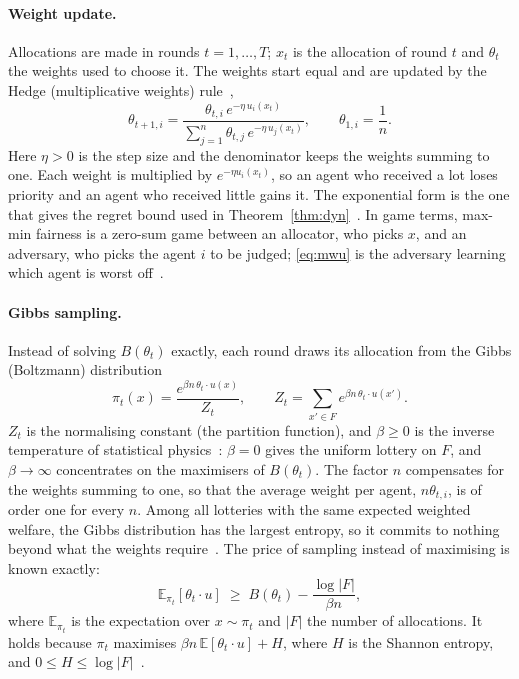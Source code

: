 \documentclass[11pt,a4paper]{article}
\newcommand{\E}{\mathbb{E}}
\begin{document}
\paragraph{Weight update.} Allocations are made in rounds $t=1,\dots,T$; $x_t$ is the allocation of round
$t$ and $\theta_t$ the weights used to choose it. The weights start equal and are updated by the Hedge
(multiplicative weights) rule~\cite{freund1997decision,freund1999adaptive,arora2012multiplicative},
\begin{equation}\label{eq:mwu}
\theta_{t+1,i}=\frac{\theta_{t,i}\,e^{-\eta\,u_i(x_t)}}{\sum_{j=1}^n\theta_{t,j}\,e^{-\eta\,u_j(x_t)}},
\qquad\theta_{1,i}=\frac1n .
\end{equation}
Here $\eta>0$ is the step size and the denominator keeps the weights summing to one. Each weight is
multiplied by $e^{-\eta u_i(x_t)}$, so an agent who received a lot loses priority and an agent who
received little gains it. The exponential form is the one that gives the regret bound used in
Theorem~\ref{thm:dyn}~\cite{freund1997decision,cesabianchi2006prediction}. In game terms, max-min
fairness is a zero-sum game between an allocator, who picks $x$, and an adversary, who picks the agent
$i$ to be judged; \eqref{eq:mwu} is the adversary learning which agent is worst
off~\cite{freund1999adaptive}.

\paragraph{Gibbs sampling.} Instead of solving $B(\theta_t)$ exactly, each round draws its allocation
from the Gibbs (Boltzmann) distribution
\begin{equation}\label{eq:gibbs}
\pi_t(x)=\frac{e^{\beta n\,\theta_t\cdot u(x)}}{Z_t},\qquad Z_t=\sum_{x'\in F}e^{\beta n\,\theta_t\cdot u(x')} .
\end{equation}
$Z_t$ is the normalising constant (the partition function), and $\beta\ge0$ is the inverse temperature
of statistical physics~\cite{metropolis1953equation,jaynes1957information}: $\beta=0$ gives the uniform
lottery on $F$, and $\beta\to\infty$ concentrates on the maximisers of $B(\theta_t)$. The factor $n$
compensates for the weights summing to one, so that the average weight per agent, $n\theta_{t,i}$, is
of order one for every $n$. Among all lotteries with the same expected weighted welfare, the Gibbs
distribution has the largest entropy, so it commits to nothing beyond what the weights
require~\cite{jaynes1957information}. The price of sampling instead of maximising is known exactly:
\begin{equation}\label{eq:entropy}
\E_{\pi_t}[\theta_t\cdot u]\;\ge\;B(\theta_t)-\frac{\log|F|}{\beta n},
\end{equation}
where $\E_{\pi_t}$ is the expectation over $x\sim\pi_t$ and $|F|$ the number of allocations. It holds
because $\pi_t$ maximises $\beta n\,\E[\theta_t\cdot u]+H$, where $H$ is the Shannon entropy, and
$0\le H\le\log|F|$~\cite{cover2006elements}.
\end{document}
